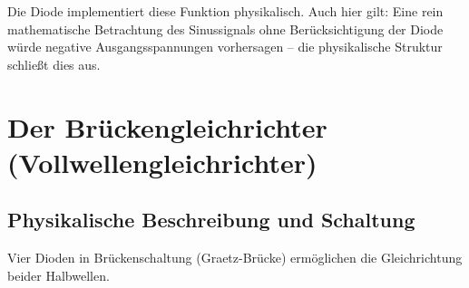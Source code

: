 ﻿\documentclass[12pt, a4paper]{article}
\begin{document}
	Die Diode implementiert diese Funktion physikalisch. Auch hier gilt: Eine rein mathematische Betrachtung des Sinussignals ohne Berücksichtigung der Diode würde negative Ausgangsspannungen vorhersagen -- die physikalische Struktur schließt dies aus.
	
	\section{Der Brückengleichrichter (Vollwellengleichrichter)}
	
	\subsection{Physikalische Beschreibung und Schaltung}
	
	Vier Dioden in Brückenschaltung (Graetz-Brücke) ermöglichen die Gleichrichtung beider Halbwellen.
	
\end{document}

